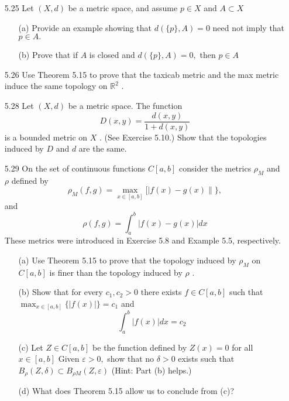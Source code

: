\documentclass[12pt]{article}
\begin{document}
\begin{enumerate}
	\item[5.25] Let $( X , d )$ be a metric space, and assume $p \in X$ and $A \subset X$
	\begin{enumerate}
		\item[(a)] Provide an example showing that $d ( \{ p \} , A ) = 0$ need not imply that $p \in A .$
		
		\item[(b)] Prove that if $A$ is closed and $d ( \{ p \} , A ) = 0 ,$ then $p \in A$
		
	\end{enumerate}
	
	\item[5.26] Use Theorem 5.15 to prove that the taxicab metric and the max metric induce
	the same topology on $\mathbb { R } ^ { 2 }$ .
	
	\item[5.28] Let $( X , d )$ be a metric space. The function
		\[D ( x , y ) = \frac { d ( x , y ) } { 1 + d ( x , y ) }\]
	is a bounded metric on $X$ . (See Exercise 5.10.) Show that the topologies
	induced by $D$ and $d$ are the same.
	
	\item[5.29] On the set of continuous functions $C [ a , b ]$ consider the metrics $\rho _ { M }$ and $\rho$ defined by
	\[\rho _ { M } ( f , g ) = \max _ { x \in [ a , b ] } [ | f ( x ) - g ( x ) \| \} ,\] and
	\[\rho ( f , g ) = \int _ { a } ^ { b } | f ( x ) - g ( x ) | d x\]
	These metrics were introduced in Exercise 5.8 and Example 5.5, respectively.
	\begin{enumerate}
		\item[(a)] Use Theorem 5.15 to prove that the topology induced by $\rho _ { M }$ on $C [ a , b ]$ is finer than the topology induced by $\rho$ .
		\item[(b)] Show that for every $c _ { 1 } , c _ { 2 } > 0$ there exists $f \in C [ a , b ]$ such that\\
		$\max _ { x \in [ a , b ] } \{ | f ( x ) | \} = c _ { 1 }$ and
		\[\int _ { a } ^ { b } | f ( x ) | d x = c _ { 2 }\]
		\item[(c)] Let $Z \in C [ a , b ]$ be the function defined by $Z ( x ) = 0$ for all $x \in [ a , b ]$
		Given $\varepsilon > 0 ,$ show that no $\delta > 0$ exists such that $B _ { \rho } ( Z , \delta ) \subset B _ { \rho M} ( Z , \varepsilon )$
		(Hint: Part (b) helps.)
		\item[(d)] What does Theorem 5.15 allow us to conclude from (c)?
	\end{enumerate}

\end{enumerate}
 
\end{document}
